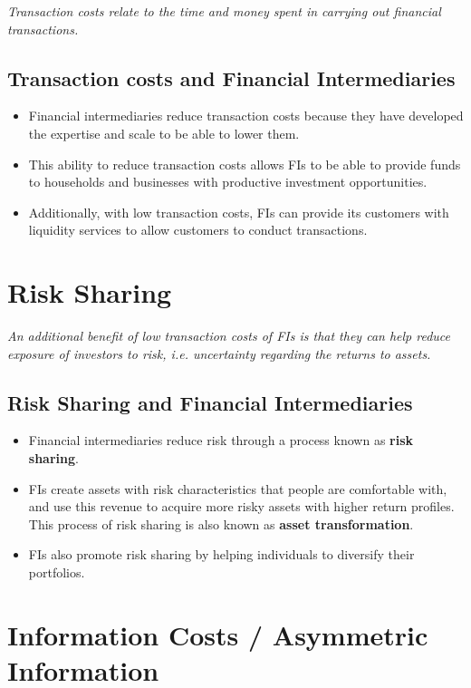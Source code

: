 \textit{Transaction costs relate to the time and money spent in carrying out financial transactions.}

\subsection{Transaction costs and Financial Intermediaries}
\begin{itemize}
    \item Financial intermediaries reduce transaction costs because they have developed the expertise and scale to be able to lower them.
    \item This ability to reduce transaction costs allows FIs to be able to provide funds to households and businesses with productive investment opportunities.
    \item Additionally, with low transaction costs, FIs can provide its customers with liquidity services to allow customers to conduct transactions.
\end{itemize}

\section{Risk Sharing}

\textit{An additional benefit of low transaction costs of FIs is that they can help reduce exposure of investors to risk, i.e. uncertainty regarding the returns to assets.}

\subsection{Risk Sharing and Financial Intermediaries}
\begin{itemize}
    \item Financial intermediaries reduce risk through a process known as \textbf{risk sharing}.
    \item FIs create assets with risk characteristics that people are comfortable with, and use this revenue to acquire more risky assets with higher return profiles. This process of risk sharing is also known as \textbf{asset transformation}.
    \item FIs also promote risk sharing by helping individuals to diversify their portfolios.
\end{itemize}

\section{Information Costs / Asymmetric Information}

